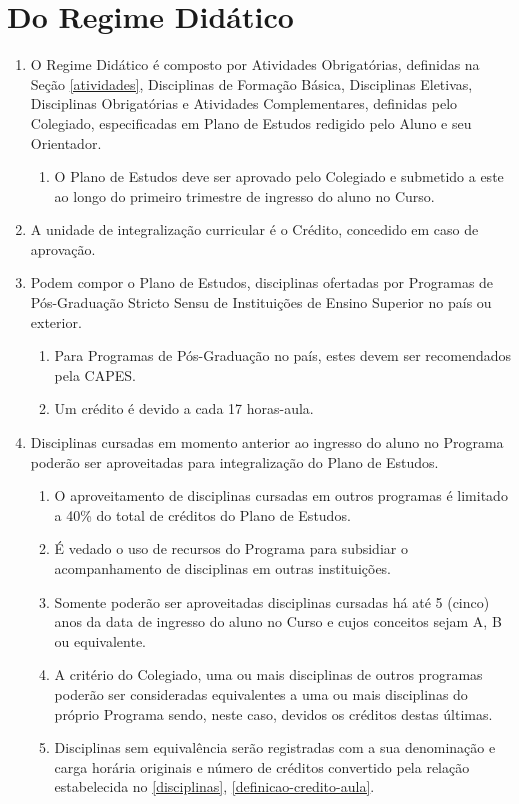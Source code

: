 \documentclass{article}
\newcommand{\singleitem}{\item[Parágrafo Único.]}
\newcommand{\grupoMenor}{Colegiado\xspace}
\begin{document}
\section{Do Regime Didático}
\begin{enumerate}
	\item O Regime Didático é composto por Atividades Obrigatórias, definidas na Seção \ref{atividades}, Disciplinas de Formação Básica, Disciplinas Eletivas, Disciplinas Obrigatórias e Atividades Complementares, definidas pelo \grupoMenor, especificadas em Plano de Estudos redigido pelo Aluno e seu Orientador.
	\begin{enumerate}
		\singleitem O Plano de Estudos deve ser aprovado pelo \grupoMenor e submetido a este ao longo do primeiro trimestre de ingresso do aluno no Curso.
	\end{enumerate}

	\item A unidade de integralização curricular é o Crédito, concedido em caso de aprovação.

	\item \label{disciplinas} Podem compor o Plano de Estudos, disciplinas ofertadas por Programas de Pós-Graduação Stricto Sensu de Instituições de Ensino Superior no país ou exterior.
	\begin{enumerate}
		\item Para Programas de Pós-Graduação no país, estes devem ser recomendados pela CAPES.
		\item \label{definicao-credito-aula} Um crédito é devido a cada 17 horas-aula.
	\end{enumerate}

	\item Disciplinas cursadas em momento anterior ao ingresso do aluno no Programa poderão ser aproveitadas para integralização do Plano de Estudos.
	\begin{enumerate}
		\item O aproveitamento de disciplinas cursadas em outros programas é limitado a 40\% do total de créditos do Plano de Estudos.
		\item É vedado o uso de recursos do Programa para subsidiar o acompanhamento de disciplinas em outras instituições.
		\item Somente poderão ser aproveitadas disciplinas cursadas há até 5 (cinco) anos da data de ingresso do aluno no Curso e cujos conceitos sejam A, B ou equivalente.
		\item A critério do \grupoMenor, uma ou mais disciplinas de outros programas poderão ser consideradas equivalentes a uma ou mais disciplinas do próprio Programa sendo, neste caso, devidos os créditos destas últimas.
		\item Disciplinas sem equivalência serão registradas com a sua denominação e carga horária originais e número de créditos convertido pela relação estabelecida no \ref{disciplinas}, \ref{definicao-credito-aula}.
	\end{enumerate}


\end{enumerate}
\end{document}
